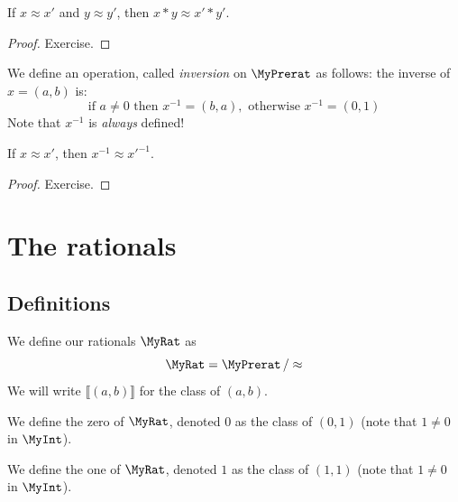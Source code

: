 \begin{lemma}
    \label{MyPrerat.mul_quotient}
    \leanok
If $x \approx x'$ and $y \approx y'$, then $x * y \approx x' * y'$.
\end{lemma}
\begin{proof}
\leanok
Exercise.
\end{proof}

\begin{definition}
    \label{MyPrerat.inv}
    \leanok
We define an operation, called \emph{inversion} on $\MyPrerat$ as follows: the inverse of $x = (a,b)$ is:
\[
\mbox{if } a \neq 0 \mbox{ then } x^{-1} = (b, a), \mbox{ otherwise } x^{-1} = (0, 1)
\]
Note that $x^{-1}$ is \emph{always} defined!
\end{definition}

\begin{lemma}
    \label{MyPrerat.inv_quotient}
    \leanok
If $x \approx x'$, then $x^{-1} \approx x'^{-1}$.
\end{lemma}
\begin{proof}
\leanok
Exercise.
\end{proof}

\section{The rationals}

\subsection{Definitions}

\begin{definition}
    \label{MyRat}
    \leanok
    We define our rationals $\MyRat$ as
\[
\MyRat = \MyPrerat \, / \approx
\]
We will write $⟦ (a, b) ⟧$ for the class of $(a,b)$.
\end{definition}

\begin{definition}
    \label{MyRat.zero}
    \leanok
We define the zero of $\MyRat$, denoted $0$ as the class of $(0,1)$ (note that $1 \neq 0$ in $\MyInt$).
\end{definition}

\begin{definition}
    \label{MyRat.one}
    \leanok
We define the one of $\MyRat$, denoted $1$ as the class of $(1,1)$ (note that $1 \neq 0$ in $\MyInt$).
\end{definition}

